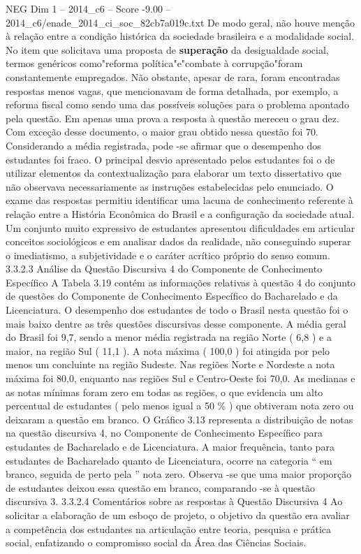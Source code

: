 \begin{textsample}{NEG Dim 1 – 2014\_c6 – Score -9.00 – 2014\_c6/enade\_2014\_ci\_soc\_82cb7a019c.txt}
De modo geral, não houve menção à relação entre a condição histórica da sociedade brasileira e a modalidade social.
No item que solicitava uma proposta de \textbf{superação} da desigualdade social, termos genéricos como"reforma política"e"combate à corrupção"foram constantemente empregados.
Não obstante, apesar de rara, foram encontradas respostas menos vagas, que mencionavam de forma detalhada, por exemplo, a reforma fiscal como sendo uma das possíveis soluções para o problema apontado pela questão.
Em apenas uma prova a resposta à questão mereceu o grau dez.
Com exceção desse documento, o maior grau obtido nessa questão foi 70.
Considerando a média registrada, pode -se afirmar que o desempenho dos estudantes foi fraco.
O principal desvio apresentado pelos estudantes foi o de utilizar elementos da contextualização para elaborar um texto dissertativo que não observava necessariamente as instruções estabelecidas pelo enunciado.
O exame das respostas permitiu identificar uma lacuna de conhecimento referente à relação entre a História Econômica do Brasil e a configuração da sociedade atual.
Um conjunto muito expressivo de estudantes apresentou dificuldades em articular conceitos sociológicos e em analisar dados da realidade, não conseguindo superar o imediatismo, a subjetividade e o caráter acrítico próprio do senso comum. 3.3.2.3 Análise da Questão Discursiva 4 do Componente de Conhecimento Específico A Tabela 3.19 contém as informações relativas à questão 4 do conjunto de questões do Componente de Conhecimento Específico do Bacharelado e da Licenciatura.
O desempenho dos estudantes de todo o Brasil nesta questão foi o mais baixo dentre as três questões discursivas desse componente.
A média geral do Brasil foi 9,7, sendo a menor média registrada na região Norte ( 6,8 ) e a maior, na região Sul ( 11,1 ).
A nota máxima ( 100,0 ) foi atingida por pelo menos um concluinte na região Sudeste.
Nas regiões Norte e Nordeste a nota máxima foi 80,0, enquanto nas regiões Sul e Centro-Oeste foi 70,0.
As medianas e as notas mínimas foram zero em todas as regiões, o que evidencia um alto percentual de estudantes ( pelo menos igual a 50 \% ) que obtiveram nota zero ou deixaram a questão em branco.
O Gráfico 3.13 representa a distribuição de notas na questão discursiva 4, no Componente de Conhecimento Específico para estudantes de Bacharelado e de Licenciatura.
A maior frequência, tanto para estudantes de Bacharelado quanto de Licenciatura, ocorre na categoria “ em branco, seguida de perto pela ” nota zero.
Observa -se que uma maior proporção de estudantes deixou essa questão em branco, comparando -se à questão discursiva 3. 3.3.2.4 Comentários sobre as respostas à Questão Discursiva 4 Ao solicitar a elaboração de um esboço de projeto, o objetivo da questão era avaliar a competência dos estudantes na articulação entre teoria, pesquisa e prática social, enfatizando o compromisso social da Área das Ciências Sociais.

\end{textsample}

